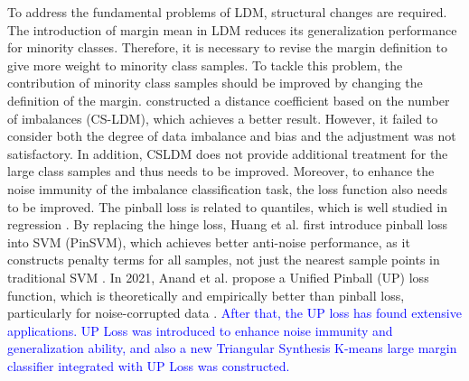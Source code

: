 \documentclass[a4paper]{cas-sc}
\begin{document}
To address the fundamental problems of LDM, structural changes are required. The introduction of margin mean in LDM reduces its generalization performance for minority classes. Therefore, it is necessary to revise the margin definition to give more weight to minority class samples. To tackle this problem, the contribution of minority class samples should be improved by changing the definition of the margin. \cite{cheng2016cost} constructed a distance coefficient based on the number of imbalances (CS-LDM), which achieves a better result. However, it failed to consider both the degree of data imbalance and bias and the adjustment was not satisfactory. In addition, CSLDM does not provide additional treatment for the large class samples and thus needs to be improved. Moreover, to enhance the noise immunity of the imbalance classification task, the loss function also needs to be improved. The pinball loss is related to quantiles, which is well studied in regression \citep{christmann2007svms,steinwart2011estimating,koenker2001quantile}. By replacing the hinge loss, Huang et al. first introduce pinball loss into SVM (PinSVM), which achieves better anti-noise performance, as it constructs penalty terms for all samples, not just the nearest sample points in traditional SVM \citep{huang2013support,huang2016solution}. In 2021, Anand et al. propose a Unified Pinball (UP) loss function, which is theoretically and empirically better than pinball loss, particularly for noise-corrupted data \citep{anand2021improvement}. \textcolor{blue}{After that, the UP loss has found extensive applications. UP Loss was introduced to enhance noise immunity and generalization ability\citep{gu2024twin}, and also a new Triangular Synthesis K-means large margin classifier integrated with UP Loss was constructed\citep{shao2024kmeans}.}
\end{document}
